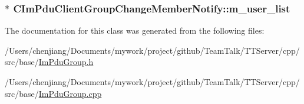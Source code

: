 \subsubsection[{m\+\_\+user\+\_\+list}]{$\ast$ C\+Im\+Pdu\+Client\+Group\+Change\+Member\+Notify\+::m\+\_\+user\+\_\+list\hspace{0.3cm}{\ttfamily [private]}}\label{class_c_im_pdu_client_group_change_member_notify_a6e17754e892efaf83e1afdac71520e36}


The documentation for this class was generated from the following files\+:\begin{DoxyCompactItemize}
\item 
/\+Users/chenjiang/\+Documents/mywork/project/github/\+Team\+Talk/\+T\+T\+Server/cpp/src/base/\hyperlink{_im_pdu_group_8h}{Im\+Pdu\+Group.\+h}\item 
/\+Users/chenjiang/\+Documents/mywork/project/github/\+Team\+Talk/\+T\+T\+Server/cpp/src/base/\hyperlink{_im_pdu_group_8cpp}{Im\+Pdu\+Group.\+cpp}\end{DoxyCompactItemize}
